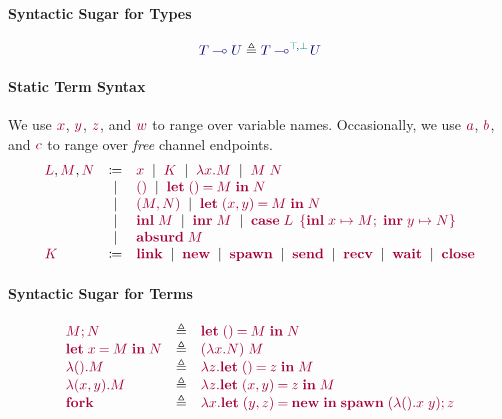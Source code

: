 \documentclass[main.tex]{subfiles}
\begin{document}
\paragraph*{Syntactic Sugar for Types}
\[
  \ty{\tylolli{T}{U}} \elabarrow \ty{\tylolli[\cs{\ptop},\cs{\pbot}]{T}{U}}
\]

\paragraph*{Static Term Syntax}
We use $\tm{x}$, $\tm{y}$, $\tm{z}$, and $\tm{w}$ to range over variable names. Occasionally, we use $\tm{a}$, $\tm{b}$, and $\tm{c}$ to range over \emph{free} channel endpoints.
\[
\begin{array}{lcl}
  \tm{L}, \tm{M}, \tm{N}
  & \coloneqq & \tm{x}
    \sep        \tm{K}
    \sep        \tm{\lambda x.M}
    \sep        \tm{M\;N} \\
  & \sep      & \tm{\unit}
    \sep        \tm{\letunit{M}{N}} \\
  & \sep      & \tm{\pair{M}{N}}
    \sep        \tm{\letpair{x}{y}{M}{N}} \\
  & \sep      & \tm{\inl{M}}
    \sep        \tm{\inr{M}}
    \sep        \tm{\casesum{L}{x}{M}{y}{N}} \\
  & \sep      & \tm{\absurd{M}} \\
  \tm{K}
  & \coloneqq & \tm{\link}
    \sep        \tm{\new}
    \sep        \tm{\spawn}
    \sep        \tm{\send}
    \sep        \tm{\recv}
    \sep        \tm{\wait}
    \sep        \tm{\close}
\end{array}
\]

\paragraph*{Syntactic Sugar for Terms}
\[
\begin{array}{lcl}
  \tm{\andthen{M}{N}}
  & \elabarrow & \tm{\letunit{M}{N}} \\
  \tm{\letbind{x}{M}{N}}
  & \elabarrow & \tm{(\lambda x.N)\;M} \\
  \tm{\lambda\unit.M}
  & \elabarrow & \tm{\lambda z.\letunit{z}{M}} \\
  \tm{\lambda\pair{x}{y}.M}
  & \elabarrow & \tm{\lambda z.\letpair{x}{y}{z}{M}} \\
  \tm{\fork}
  & \elabarrow & \tm{\lambda x.\letpair{y}{z}{\new}{\andthen{\spawn\;{(\lambda\unit.x\;y)}}{z}}}
\end{array}
\]
\end{document}
